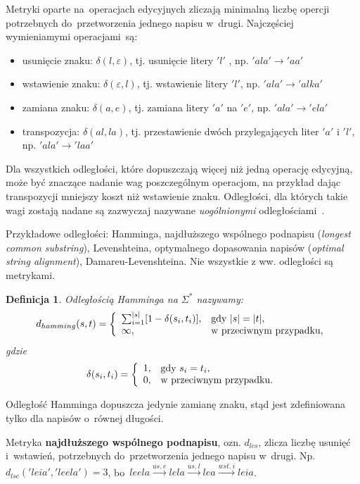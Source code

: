 \documentclass[12pt, twoside, openany]{report}
\theoremstyle{plain}
\newtheorem{defi}{Definicja}[section]
\begin{document}
Metryki oparte na~operacjach edycyjnych zliczają minimalną liczbę opercji potrzebnych do~przetworzenia jednego napisu w~drugi. Najczęściej wymieniamymi operacjami~są:
\begin{itemize}
\item usunięcie znaku: $\delta(l, \varepsilon)$, tj. usunięcie litery $'l'$ , np. $'ala' \rightarrow 'aa'$
\item wstawienie znaku: $\delta(\varepsilon, l)$, tj. wstawienie litery $'l'$, np. $'ala' \rightarrow 'alka'$
\item zamiana znaku: $\delta(a, e)$, tj. zamiana litery $'a'$ na $'e'$, np. $'ala' \rightarrow 'ela'$
\item transpozycja: $\delta(al, la)$, tj. przestawienie dwóch przylegających liter $'a'$ i $'l'$, np. $'ala' \rightarrow 'laa'$
\end{itemize}
Dla wszystkich odległości, które dopuszczają więcej niż jedną operację edycyjną, może być znaczące nadanie wag poszczególnym operacjom, na przykład dając transpozycji mniejszy koszt niż wstawienie znaku. Odległości, dla których takie wagi zostają nadane są zazwyczaj nazywane \emph{uogólnionymi} odległościami~\cite{Boytsov2011:indexingmethods}.

Przykładowe odległości: Hamminga, najdłuższego wspólnego podnapisu (\emph{longest common substring}), Levenshteina, optymalnego dopasowania napisów (\emph{optimal string alignment}), Damareu-Levenshteina. Nie wszystkie z ww. odległości są metrykami.

\begin{defi}
\emph{Odległością Hamminga} na $\Sigma^*$ nazywamy:
$$
d_{hamming}(s, t) = \left\{
\begin{array}{l l}     
    \sum_{i=1}^{|s|}[1 - \delta(s_i, t_i)], & \text{gdy } |s| = |t|,\\
    \infty, & \text{w przeciwnym przypadku},
\end{array}\right.
$$
gdzie 
$$
\delta(s_i, t_i) = \left\{
\begin{array}{l l}     
    1, & \text{gdy } s_i = t_i,\\
    0, & \text{w przeciwnym przypadku}.
\end{array}\right.
$$
\end{defi}

Odległość Hamminga dopuszcza jedynie zamianę znaku, stąd jest zdefiniowana tylko dla napisów o~równej długości.

Metryka \textbf{najdłuższego wspólnego podnapisu}, ozn. $d_{lcs}$, zlicza liczbę usunięć i~wstawień, potrzebnych do~przetworzenia jednego napisu w~drugi. Np. $d_{lsc}('leia', 'leela') = 3$, bo~$leela  \xrightarrow{us.\ e} lela  \xrightarrow{us.\ l} lea  \xrightarrow{wst.\ i} leia$.\\
\end{document}
